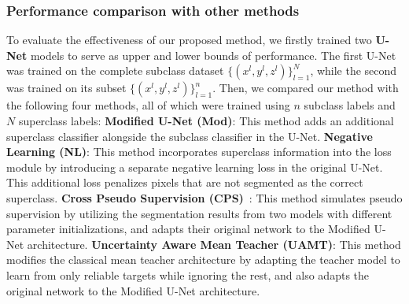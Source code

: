 \documentclass[runningheads]{llncs}
\begin{document}
\subsubsection{Performance comparison with other methods}
To evaluate the effectiveness of our proposed method, we firstly trained two \textbf{U-Net} models \cite{ronneberger2015u} to serve as upper and lower bounds of performance. The first U-Net was trained on the complete subclass dataset $\{(x^l,y^l,z^l)\}_{l=1}^N$, while the second was trained on its subset $\{(x^l,y^l,z^l)\}_{l=1}^n$. Then, we compared our method with the following four methods, all of which were trained using $n$ subclass labels and $N$ superclass labels: \textbf{Modified U-Net (Mod)}: This method adds an additional superclass classifier alongside the subclass classifier in the U-Net.
\textbf{Negative Learning (NL)}: This method incorporates superclass information into the loss module by introducing a separate negative learning loss in the original U-Net. This additional loss penalizes pixels that are not segmented as the correct superclass.
\textbf{Cross Pseudo Supervision (CPS)}~\cite{chen2021semi}: This method simulates pseudo supervision by utilizing the segmentation results from two models with different parameter initializations, and adapts their original network to the Modified U-Net architecture.
\textbf{Uncertainty Aware Mean Teacher (UAMT)}\cite{yu2019uncertainty}: This method modifies the classical mean teacher architecture\cite{tarvainen2017mean} by adapting the teacher model to learn from only reliable targets while ignoring the rest, and also adapts the original network to the Modified U-Net architecture.
\end{document}
